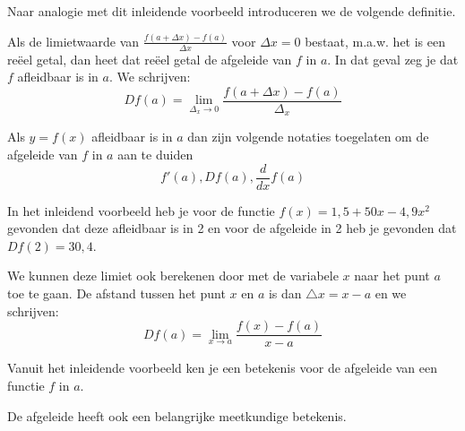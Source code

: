 Naar analogie met dit inleidende voorbeeld introduceren we de volgende definitie.

\begin{definitie}
	Als de limietwaarde van $\frac{f(a+\Delta x)-f(a)}{\Delta x}$ voor $\Delta x = 0$ bestaat, m.a.w. het is een re\"eel getal, dan heet dat re\"eel getal de afgeleide van $f$ in $a$.
	In dat geval zeg je dat $f$ afleidbaar is in $a$. We schrijven:
	\[Df(a) =\lim_{\Delta_x \to 0} \frac{f(a+\Delta x)-f(a)}{\Delta_x} \]	
\end{definitie}


\begin{notatie}
	Als $y=f(x)$ afleidbaar is in $a$ dan zijn volgende notaties toegelaten om de afgeleide van $f$ in $a$ aan te duiden
	\[f'(a), Df(a), \frac{d}{dx}f(a)\]
\end{notatie}


\begin{voorbeeld}
	In het inleidend voorbeeld heb je voor de functie  $f(x)=1,5+50 x -4,9 x^2$ gevonden dat deze afleidbaar is in 2 en voor de afgeleide in 2 heb je gevonden dat $Df(2)=30,4$.
\end{voorbeeld}\vspace{0,5 cm}

We kunnen deze limiet ook berekenen door met de variabele $x$ naar
het punt $a$ toe te gaan. De afstand tussen het punt $x$ en $a$
is dan $\triangle x=x-a$ en we schrijven:
\[
Df(a)={\displaystyle \lim_{x\to a}}\frac{f(x)-f(a)}{x-a}
\]

Vanuit het inleidende voorbeeld ken je een betekenis voor de afgeleide van een functie $f$ in $a$.\vspace{0,2 cm}

\vspace{0,5 cm}

De afgeleide heeft ook een belangrijke meetkundige betekenis.\vspace{0,2 cm}

\vspace{0,2 cm}

